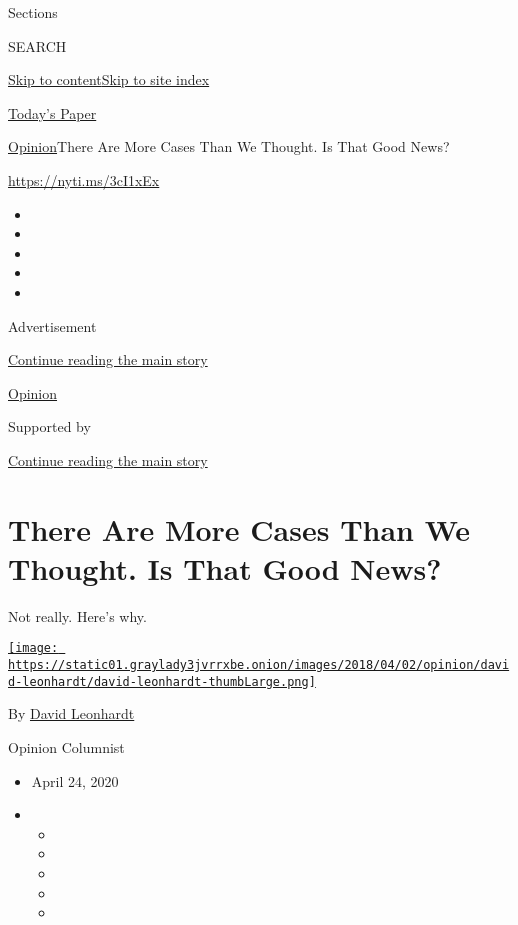 Sections

SEARCH

\protect\hyperlink{site-content}{Skip to
content}\protect\hyperlink{site-index}{Skip to site index}

\href{https://myaccount.nytimes3xbfgragh.onion/auth/login?response_type=cookie\&client_id=vi}{}

\href{https://www.nytimes3xbfgragh.onion/section/todayspaper}{Today's
Paper}

\href{/section/opinion}{Opinion}\textbar{}There Are More Cases Than We
Thought. Is That Good News?

\url{https://nyti.ms/3cI1xEx}

\begin{itemize}
\item
\item
\item
\item
\item
\end{itemize}

Advertisement

\protect\hyperlink{after-top}{Continue reading the main story}

\href{/section/opinion}{Opinion}

Supported by

\protect\hyperlink{after-sponsor}{Continue reading the main story}

\hypertarget{there-are-more-cases-than-we-thought-is-that-good-news}{%
\section{There Are More Cases Than We Thought. Is That Good
News?}\label{there-are-more-cases-than-we-thought-is-that-good-news}}

Not really. Here's why.

\href{https://www.nytimes3xbfgragh.onion/by/david-leonhardt}{\texttt{[image: https://static01.graylady3jvrrxbe.onion/images/2018/04/02/opinion/david-leonhardt/david-leonhardt-thumbLarge.png]}}

By \href{https://www.nytimes3xbfgragh.onion/by/david-leonhardt}{David
Leonhardt}

Opinion Columnist

\begin{itemize}
\item
  April 24, 2020
\item
  \begin{itemize}
  \item
  \item
  \item
  \item
  \item
  \end{itemize}
\end{itemize}


